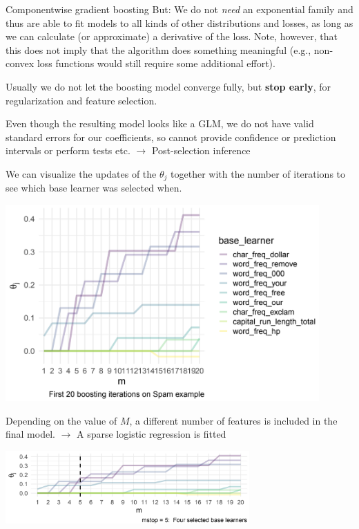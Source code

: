 \begin{vbframe}{Componentwise gradient boosting}
But: We do not \emph{need} an exponential family and thus are able to fit models to all kinds of other distributions and losses, as long as we can calculate (or approximate) a derivative of the loss. Note, however, that this does not imply that the algorithm does something meaningful (e.g., non-convex loss functions would still require some additional effort).

\lz

Usually we do not let the boosting model converge fully, but \textbf{stop early}, for regularization and feature selection.

\lz

Even though the resulting model looks like a GLM, we do not have valid standard errors for our coefficients,
so cannot provide confidence or prediction intervals or perform tests etc.
$\longrightarrow$ Post-selection inference



\framebreak

We can visualize the updates of the $\theta_j$ together with the number of iterations to see which base learner was selected when.

\begin{center}
\includegraphics[width=0.9\textwidth]{figure_man/componentwise-gb.png}
\end{center}

\framebreak

Depending on the value of $M$, a different number of features is included in the final model. $\rightarrow$ A sparse logistic regression is fitted

\begin{center}
\includegraphics[width=0.7\textwidth]{figure_man/mstop5.png}
\end{center}



\end{vbframe}
